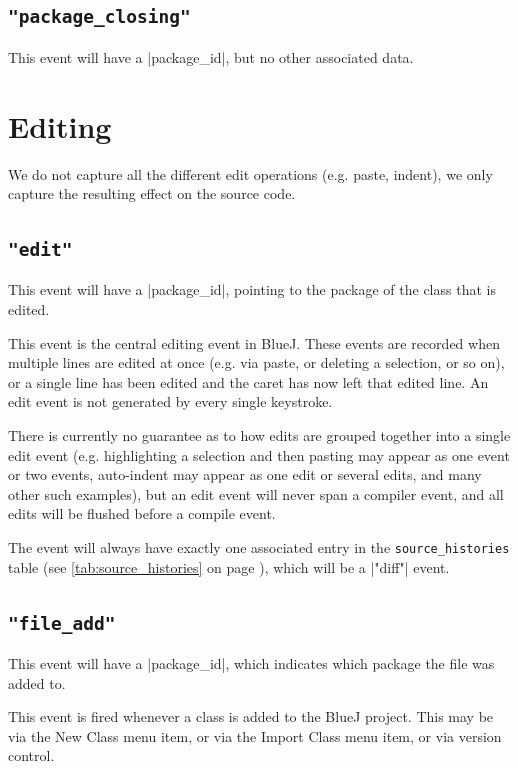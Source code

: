 \documentclass{report}
\newcommand{\myref}[1]{\autoref{#1} on page \pageref*{#1}}
\newcommand{\tabref}[1]{\lstinline|#1| table (see \myref{tab:#1})}
\newcommand{\intern}{This table may be interned, see \myref{def:intern}.}
\begin{document}

\subsection{\lstinline!"package_closing"!}

This event will have a |package_id|, but no other associated data.


\section{Editing}

We do not capture all the different edit operations (e.g. paste, indent), we
only capture the resulting effect on the source code.

\subsection{\lstinline!"edit"!}

This event will have a |package_id|, pointing to the package of the class that
is edited.

This event is the central editing event in BlueJ.  These events are recorded
when multiple lines are edited at once (e.g. via paste, or deleting a
selection, or so on), or a single line has been edited and the caret
has now left that edited line.  An edit event is not generated by every single
keystroke.

There is currently no guarantee as to how edits are grouped together into a single edit
event (e.g. highlighting a selection and then pasting may appear as one event
or two events, auto-indent may appear as one edit or several edits, and many
other such examples), but an edit event will never span a compiler event, and
all edits will be flushed before a compile event.

The event will always have exactly one associated entry in the
\tabref{source_histories}, which will be a |"diff"| event.

\subsection{\lstinline!"file_add"!}

This event will have a |package_id|, which indicates which package the file
was added to.

This event is fired whenever a class is added to the BlueJ project.  This may
be via the New Class menu item, or via the Import Class menu item, or via
version control.
\end{document}
